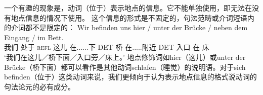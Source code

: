 一个有趣的现象是，动词（位于）表示地点的信息。它不能单独使用，即无法在没有地点信息的情况下使用。
\z
这个信息的形式是不固定的，句法范畴或介词短语内的介词都不是限定的：
\ea
\gll Wir befinden uns hier / unter der Brücke / neben dem Eingang / im Bett.\\
	 我们 处于 \textsc{refl} 这儿 {} 在......下 DET 桥 {} 在.....附近 DET 入口 {} 在 床\\
\glt `我们在这儿／桥下面／入口旁／床上。'
\z
地点修饰词如hier（这儿）或unter der Brücke（桥下面）都可以看作是其他动词schlafen（睡觉）的说明语。对于sich befinden（位于）这类动词来说，我们更倾向于认为表示地点信息的格式说动词的句法论元的必有成分。
%
%
